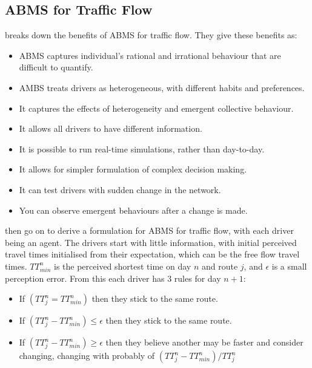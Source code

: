 \documentclass[12pt, a4paper, onecolumn]{article}
\begin{document}
\subsection{ABMS for Traffic Flow}
\cite{Zheng2013} breaks down the benefits of ABMS for traffic flow. They give these benefits as:

\begin{itemize}
	\item ABMS captures individual's rational and irrational behaviour that are difficult to quantify.
	\item AMBS treats drivers as heterogeneous, with different habits and preferences.
	\item It captures the effects of heterogeneity and emergent collective behaviour.
	\item It allows all drivers to have different information.
	\item It is possible to run real-time simulations, rather than day-to-day.
	\item It allows for simpler formulation of complex decision making.
	\item It can test drivers with sudden change in the network.
	\item You can observe emergent behaviours  after a change is made.
	\end{itemize}

\citeauthor{Zheng2013} then go on to derive a formulation for ABMS for traffic flow, with each driver being an agent. The drivers start with little information, with initial perceived travel times initialised from their expectation, which can be the free flow travel times. $TT_{min}^n$ is the perceived shortest time on day $n$ and route $j$, and $\epsilon$ is a small perception error. From this each driver has 3 rules for day $n+1$:

\begin{itemize}
	\item{If $(TT_{j}^n = TT_{min}^n)$ then they stick to the same route.}
	\item{If $(TT_{j}^n - TT_{min}^n) \leq \epsilon$ then they stick to the same route.}
	\item{If $(TT_{j}^n - TT_{min}^n ) \geq \epsilon$ then they believe another may be faster and consider changing, changing with probably of $(TT_{j}^n - TT_{min}^n )/TT_{j}^n$}
	\end{itemize}
\end{document}

